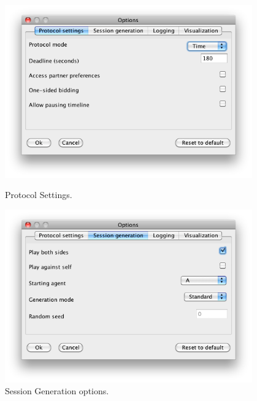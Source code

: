 \documentclass[]{article}
\begin{document}
\begin{itemize}
		\begin{figure}[ht]
		\center
		\begin{minipage}[b]{0.4\linewidth}
			\includegraphics[width=0.95\textwidth]{media/TourOptions1.png}
		\caption{Protocol Settings.}
		\label{fig:TourOptions1}
		\end{minipage}
		\begin{minipage}[b]{0.4\linewidth}
			\includegraphics[width=0.95\textwidth]{media/TourOptions2.png}
		\caption{Session Generation options.}\label{fig:TourOptions2}
		\end{minipage}
		\end{figure}



\end{itemize}
\end{document}

